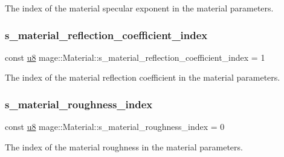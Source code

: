The index of the material specular exponent in the material parameters. \hypertarget{structmage_1_1_material_a8d872101d667cc6fad64fde83fe8c07d}{}\label{structmage_1_1_material_a8d872101d667cc6fad64fde83fe8c07d} 
\subsubsection{\texorpdfstring{s\+\_\+material\+\_\+reflection\+\_\+coefficient\+\_\+index}{s\_material\_reflection\_coefficient\_index}}
{\footnotesize\ttfamily const \hyperlink{namespacemage_a5a362e2d56fc439362a80516ecae7828}{u8} mage\+::\+Material\+::s\+\_\+material\+\_\+reflection\+\_\+coefficient\+\_\+index = 1\hspace{0.3cm}{\ttfamily [static]}}

The index of the material reflection coefficient in the material parameters. \hypertarget{structmage_1_1_material_ad5ef721b8341cc944d1bd52ed734fc59}{}\label{structmage_1_1_material_ad5ef721b8341cc944d1bd52ed734fc59} 
\subsubsection{\texorpdfstring{s\+\_\+material\+\_\+roughness\+\_\+index}{s\_material\_roughness\_index}}
{\footnotesize\ttfamily const \hyperlink{namespacemage_a5a362e2d56fc439362a80516ecae7828}{u8} mage\+::\+Material\+::s\+\_\+material\+\_\+roughness\+\_\+index = 0\hspace{0.3cm}{\ttfamily [static]}}

The index of the material roughness in the material parameters. \hypertarget{structmage_1_1_material_ad830f0f8fbf9f1ccd6e8304bf0bd2150}{}\label{structmage_1_1_material_ad830f0f8fbf9f1ccd6e8304bf0bd2150} 
